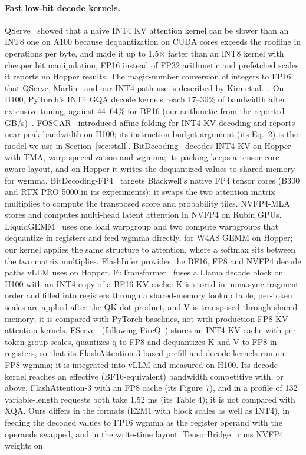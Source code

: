 \documentclass[11pt]{article}
\begin{document}
\paragraph{Fast low-bit decode kernels.} QServe~\cite{lin2025qserve} showed that a naive INT4 KV attention kernel can be slower than an INT8 one on A100 because dequantization on CUDA cores exceeds the roofline in operations per byte, and made it up to 1.5$\times$ faster than an INT8 kernel with cheaper bit manipulation, FP16 instead of FP32 arithmetic and prefetched scales; it reports no Hopper results. The magic-number conversion of integers to FP16 that QServe, Marlin~\cite{frantar2024marlin} and our INT4 path use is described by Kim et al.~\cite{kim2022elephants}. On H100, PyTorch's INT4 GQA decode kernels reach 17--30\% of bandwidth after extensive tuning, against 44--64\% for BF16 (our arithmetic from the reported GB/s)~\cite{pytorch2024int4decoding}. FOSCAR~\cite{zhuang2026foscar} introduced affine folding for INT4 KV decoding and reports near-peak bandwidth on H100; its instruction-budget argument (its Eq.~2) is the model we use in Section~\ref{sec:stall}. BitDecoding~\cite{du2025bitdecoding} decodes INT4 KV on Hopper with TMA, warp specialization and wgmma; its packing keeps a tensor-core-aware layout, and on Hopper it writes the dequantized values to shared memory for wgmma. BitDecoding-FP4~\cite{du2026bitdecodingfp4} targets Blackwell's native FP4 tensor cores (B300 and RTX PRO 5000 in its experiments); it swaps the two attention matrix multiplies to compute the transposed score and probability tiles. NVFP4-MLA~\cite{ni2026nvfp4mla} stores and computes multi-head latent attention in NVFP4 on Rubin GPUs. LiquidGEMM~\cite{hu2025liquidgemm} uses one load warpgroup and two compute warpgroups that dequantize in registers and feed wgmma directly, for W4A8 GEMM on Hopper; our kernel applies the same structure to attention, where a softmax sits between the two matrix multiplies. FlashInfer provides the BF16, FP8 and NVFP4 decode paths vLLM uses on Hopper. FuTransformer~\cite{wang2026futransformer} fuses a Llama decode block on H100 with an INT4 copy of a BF16 KV cache: K is stored in mma.sync fragment order and filled into registers through a shared-memory lookup table, per-token scales are applied after the QK dot product, and V is transposed through shared memory; it is compared with PyTorch baselines, not with production FP8 KV attention kernels. FServe~\cite{baek2026fserve} (following FireQ~\cite{baek2025fireq}) stores an INT4 KV cache with per-token group scales, quantizes q to FP8 and dequantizes K and V to FP8 in registers, so that its FlashAttention-3-based prefill and decode kernels run on FP8 wgmma; it is integrated into vLLM and measured on H100. Its decode kernel reaches an effective (BF16-equivalent) bandwidth competitive with, or above, FlashAttention-3 with an FP8 cache (its Figure 7), and in a profile of 132 variable-length requests both take 1.52 ms (its Table 4); it is not compared with XQA. Ours differs in the formats (E2M1 with block scales as well as INT4), in feeding the decoded values to FP16 wgmma as the register operand with the operands swapped, and in the write-time layout. TensorBridge~\cite{zou2026tensorbridge} runs NVFP4 weights on 
\end{document}
